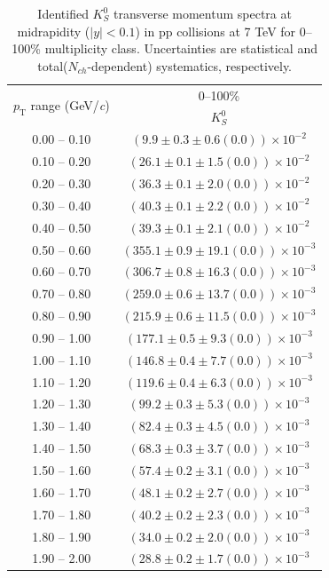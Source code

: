 \clearpage
\begin{table}
\caption{Identified $K^{0}_{S}$ transverse momentum spectra at midrapidity ($|y|<0.1$) in pp collisions at 7 TeV for 0--100\% multiplicity class. Uncertainties are statistical and total($N_{ch}$-dependent) systematics, respectively.}
\label{tab:K0Short_0to100}
\begin{center}
\begin{tabular}{ c | c }
\hline
\multirow{2}{*}{$p_{\mathrm{T}}$ range (GeV/\textit{c})} & \multicolumn{1}{c}{0--100\%} \\ & $K^{0}_{S}$\\ 
\hline
0.00 -- 0.10 & $(9.9\pm0.3\pm0.6(0.0))\times10^{-2}$ \\ 
0.10 -- 0.20 & $(26.1\pm0.1\pm1.5(0.0))\times10^{-2}$ \\ 
0.20 -- 0.30 & $(36.3\pm0.1\pm2.0(0.0))\times10^{-2}$ \\ 
0.30 -- 0.40 & $(40.3\pm0.1\pm2.2(0.0))\times10^{-2}$ \\ 
0.40 -- 0.50 & $(39.3\pm0.1\pm2.1(0.0))\times10^{-2}$ \\ 
0.50 -- 0.60 & $(355.1\pm0.9\pm19.1(0.0))\times10^{-3}$ \\ 
0.60 -- 0.70 & $(306.7\pm0.8\pm16.3(0.0))\times10^{-3}$ \\ 
0.70 -- 0.80 & $(259.0\pm0.6\pm13.7(0.0))\times10^{-3}$ \\ 
0.80 -- 0.90 & $(215.9\pm0.6\pm11.5(0.0))\times10^{-3}$ \\ 
0.90 -- 1.00 & $(177.1\pm0.5\pm9.3(0.0))\times10^{-3}$ \\ 
1.00 -- 1.10 & $(146.8\pm0.4\pm7.7(0.0))\times10^{-3}$ \\ 
1.10 -- 1.20 & $(119.6\pm0.4\pm6.3(0.0))\times10^{-3}$ \\ 
1.20 -- 1.30 & $(99.2\pm0.3\pm5.3(0.0))\times10^{-3}$ \\ 
1.30 -- 1.40 & $(82.4\pm0.3\pm4.5(0.0))\times10^{-3}$ \\ 
1.40 -- 1.50 & $(68.3\pm0.3\pm3.7(0.0))\times10^{-3}$ \\ 
1.50 -- 1.60 & $(57.4\pm0.2\pm3.1(0.0))\times10^{-3}$ \\ 
1.60 -- 1.70 & $(48.1\pm0.2\pm2.7(0.0))\times10^{-3}$ \\ 
1.70 -- 1.80 & $(40.2\pm0.2\pm2.3(0.0))\times10^{-3}$ \\ 
1.80 -- 1.90 & $(34.0\pm0.2\pm2.0(0.0))\times10^{-3}$ \\ 
1.90 -- 2.00 & $(28.8\pm0.2\pm1.7(0.0))\times10^{-3}$ \\ 

\end{tabular}
\end{center}
\end{table}
